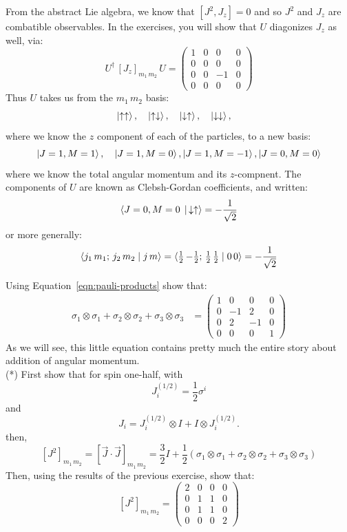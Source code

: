 \documentclass[12pt]{article}
\begin{document}
From the abstract Lie algebra, we know that
$[J^2, J_z] = 0$
and so $J^2$ and $J_z$ are combatible observables.  In the exercises,
you will show that $U$ diagonizes $J_z$ as well, via:
\begin{equation}
\label{eqn:jz_jm}
U^\dagger \, [J_z]_{m_1\,m_2} \, U
= \begin{pmatrix}1&0&0&0\\0&0&0&0\\0&0&-1&0\\0&0&0&0\end{pmatrix}
\end{equation}
Thus $U$ takes us from the $m_1\,m_2$ basis:
$$\ket{\uparrow\uparrow}, \quad \ket{\uparrow\downarrow}, \quad
\ket{\downarrow\uparrow}, \quad \ket{\downarrow\downarrow}, \quad$$
where we know the $z$ component of each of the particles, to a new basis:
$$\ket{J=1,M=1}, \quad \ket{J=1,M=0}, \ket{J=1,M=-1}, \ket{J=0,M=0}$$
where we know the total angular momentum and its $z$-compnent.
The components of $U$ are known as Clebsh-Gordan coefficients, and written:
$$\braket{J=0,M=0 \, \mid \, \downarrow\uparrow} = -\frac{1}{\sqrt{2}}$$
or more generally:
$$\braket{ j_1\, m_1;\, j_2\, m_2 \mid j\, m } = 
\braket{ \tfrac{1}{2}\, {-\tfrac{1}{2}};\, \tfrac{1}{2}\, \tfrac{1}{2} \mid 0\, 0 } = 
-\frac{1}{\sqrt{2}}$$

\exercise Using Equation~\ref{eqn:pauli-products} show that:
\begin{align*}
\sigma_1\otimes\sigma_1 + \sigma_2\otimes\sigma_2 + \sigma_3\otimes\sigma_3 &= 
\begin{pmatrix}1&0&0&0\\0&-1&2&0\\0&2&-1&0\\0&0&0&1\end{pmatrix}
\end{align*}
As we will see, this little equation contains pretty much the entire story about
addition of angular momentum.\\[5pt]

\exercise (*) First show that for spin one-half, with
$$J^{(1/2)}_i = \frac{1}{2} \sigma^i$$
and
\begin{equation*}
  J_i = J_i^{(1/2)} \otimes I + I \otimes J_i^{(1/2)}.
\end{equation*}
then, 
$$[J^2]_{m_1\, m_2} =
[\vec{J}\cdot\vec{J}]_{m_1\, m_2} =
\frac{3}{2} I + \frac{1}{2} (\sigma_1\otimes\sigma_1 + \sigma_2\otimes\sigma_2 + \sigma_3\otimes\sigma_3)$$
Then, using the results of the previous exercise, show that:
$$[J^2]_{m_1\, m_2} = \begin{pmatrix}2&0&0&0\\0&1&1&0\\0&1&1&0\\0&0&0&2\end{pmatrix}$$
\end{document}

